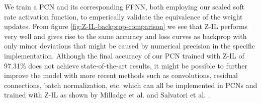 \documentclass[a4paper,11pt]{article} %
\begin{document}
We train a PCN and its corresponding FFNN, both employing our scaled soft rate activation function, to emperically validate the equivalence of the weight updates. From figure \ref{fig:Z-IL-backprop-comparison} we see that Z-IL performs very well and gives rise to the same accuracy and loss curves as backprop with only minor deviations that might be caused by numerical precision in the specific implementation. Although the final accuracy of our PCN trained with Z-IL of 97.31\% does not achieve state-of-the-art results, it might be possible to further improve the model with more recent methods such as convolutions, residual connections, batch normalization, etc. which can all be implemented in PCNs and trained with Z-IL as shown by Milladge et al. \cite{milladge2020predictive} and Salvatori et al. \cite{salvatori2021reverse}. 
\end{document}
